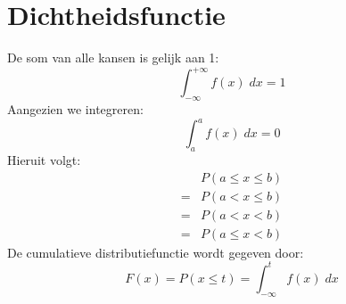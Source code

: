 \documentclass[12pt]{report}
\begin{document}
\section{Dichtheidsfunctie}
De som van alle kansen is gelijk aan 1:
$$\int_{-\infty}^{+\infty} f(x)\;dx = 1$$
Aangezien we integreren:
$$\int_{a}^{a} f(x)\;dx = 0$$
Hieruit volgt:
\begin{equation*}
	\begin{split}
		& P(a \leq x \leq b) \\
		= & P(a < x \leq b)  \\
		= & P(a < x < b)     \\
		= & P(a \leq x < b)
	\end{split}
\end{equation*}
De cumulatieve distributiefunctie wordt gegeven door:
$$F(x) = P(x \leq t) = \int_{-\infty}^{t} f(x)\;dx$$
\end{document}
